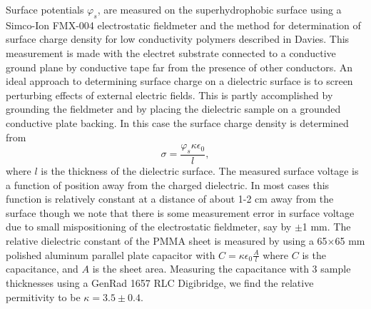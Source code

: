 \documentclass[12pt,a4paper,oneside]{book}
\begin{document}
Surface potentials $\varphi_s$, are measured on the superhydrophobic surface using a Simco-Ion FMX-004 electrostatic fieldmeter and the method for determination of surface charge density for low conductivity polymers described in Davies\cite{davies_examination_1967}. This measurement is made with the electret substrate connected to a conductive ground plane by conductive tape far from the presence of other conductors. An ideal approach to determining surface charge on a dielectric surface is to screen perturbing effects of external electric fields. This is partly accomplished by grounding the fieldmeter and by placing the dielectric sample on a grounded conductive plate backing. In this case the surface charge density is determined from
\[ \sigma = \frac{\varphi_s \kappa \epsilon_0}{l}, \]
where $l$ is the thickness of the dielectric surface. The measured surface voltage is a function of position away from the charged dielectric. In most cases this function is relatively constant at a distance of about 1-2 cm away from the surface though we note that there is some measurement error in surface voltage due to small mispositioning of the electrostatic fieldmeter, say by $\pm$1 mm. The relative dielectric constant of the PMMA sheet is measured by using a 65$\times$65 mm polished aluminum parallel plate capacitor with $C = \kappa \epsilon_0 \frac{A}{l}$ where $C$ is the capacitance, and $A$ is the sheet area. Measuring the capacitance with 3 sample thicknesses using a GenRad 1657 RLC Digibridge, we find the relative permitivity to be $\kappa = 3.5 \pm 0.4$.  
\end{document}
